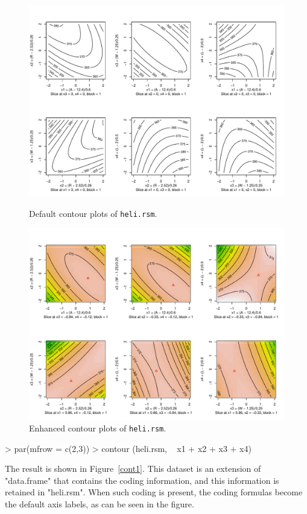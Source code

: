 \documentclass[article,nojss]{jss}
\begin{document}
\begin{figure}
\begin{center}
\includegraphics[width=.95\linewidth, viewport=0 10 560 396, clip]{rsm-plots-cont1.pdf}
\end{center}
\vspace{-26pt}
\caption{Default contour plots of \texttt{heli.rsm}.}\label{cont1}
\begin{center}
\includegraphics[width=.95\linewidth, viewport=0 10 560 422, clip]{rsm-plots-cont2.pdf}
\end{center}
\vspace{-26pt}
\caption{Enhanced contour plots of \texttt{heli.rsm}.}\label{cont2}
\end{figure}
\begin{Schunk}
\begin{Sinput}
> par(mfrow = c(2,3))
> contour (heli.rsm, ~ x1 + x2 + x3 + x4)
\end{Sinput}
\end{Schunk}
The result is shown in Figure~\ref{cont1}.  This dataset is an extension of "data.frame" that contains the coding information, and this information is retained in "heli.rsm".  When such coding is present, the coding formulas become the default axis labels, as can be seen in the figure.  
\end{document}
